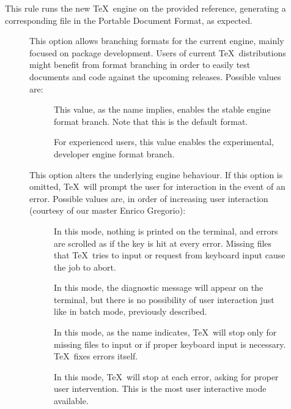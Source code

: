 \begin{description}
\item[]
This rule runs the new  \TeX\ engine on the provided  reference, generating a corresponding file in the Portable Document Format, as expected.

\begin{description}
\item[] This option allows branching formats for the current engine, mainly focused on package development. Users of current \TeX\ distributions might benefit from format branching in order to easily test documents and code against the upcoming releases. Possible values are:

\begin{description}
\item[] This value, as the name implies, enables the stable engine format branch. Note that this is the default format.

\item[] For experienced users, this value enables the experimental, developer engine format branch.
\end{description}

\item[] This option alters the underlying engine behaviour. If this option is omitted, \TeX\ will prompt the user for interaction in the event of an error. Possible values are, in order of increasing user interaction (courtesy of our master Enrico Gregorio):

\begin{description}
\item[] In this mode, nothing is printed on the terminal, and errors are scrolled as if the  key is hit at every error. Missing files that \TeX\ tries to input or request from keyboard input cause the job to abort.

\item[] In this mode, the diagnostic message will appear on the terminal, but there is no possibility of user interaction just like in batch mode, previously described.

\item[] In this mode, as the name indicates, \TeX\ will stop only for missing files to input or if proper keyboard input is necessary. \TeX\ fixes errors itself.

\item[] In this mode, \TeX\ will stop at each error, asking for proper user intervention. This is the most user interactive mode available.
\end{description}


\end{description}
\end{description}
